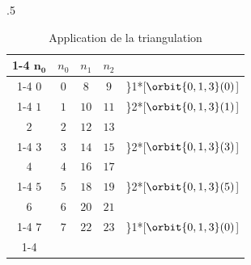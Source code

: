 \begin{table}[htb!]
	\caption{Tableaux de filtrage des faces scindées}
	\label{tab:reevaluation-scripts-alternative-appariement-filtrage-faces}
	\begin{subtable}{.5\linewidth}
		\caption{Application de la triangulation}
		\label{tab:reevaluation-scripts-alternative-appariement-filtrage-faces-triangulation}
		\begin{tabular}{|c||c|c|c|l@{\,}}
			\cline{1-4}%
			\(\mathbf{n_{0}}\) & \(n_{0}\)                    & \(n_{1}\)                     & \(n_{2}\)                     &                                                   \\
			\cline{1-4}%
			\addlinespace[2pt]%
			\cline{1-4}%
			\(0\)              & \textcolor{myblueink}{\(0\)} & \textcolor{myblueink}{\(8\)}  & \textcolor{myblueink}{\(9\)}  & \rdelim\}{1}{*}[\hspace{2pt}\(\orbit{0,1,3}(0)\)] \\
			\cline{1-4}%
			\(1\)              & \textcolor{myblueink}{\(1\)} & \textcolor{myblueink}{\(10\)} & \textcolor{myblueink}{\(11\)} & \rdelim\}{2}{*}[\(\orbit{0,1,3}(1)\)]             \\
			\(2\)              & \textcolor{myblueink}{\(2\)} & \textcolor{myblueink}{\(12\)} & \textcolor{myblueink}{\(13\)} &                                                   \\
			\cline{1-4}%
			\(3\)              & \textcolor{myblueink}{\(3\)} & \textcolor{myblueink}{\(14\)} & \textcolor{myblueink}{\(15\)} & \rdelim\}{2}{*}[\(\orbit{0,1,3}(3)\)]             \\
			\(4\)              & \textcolor{myblueink}{\(4\)} & \textcolor{myblueink}{\(16\)} & \textcolor{myblueink}{\(17\)} &                                                   \\
			\cline{1-4}%
			\(5\)              & \textcolor{myblueink}{\(5\)} & \textcolor{myblueink}{\(18\)} & \textcolor{myblueink}{\(19\)} & \rdelim\}{2}{*}[\(\orbit{0,1,3}(5)\)]             \\
			\(6\)              & \textcolor{myblueink}{\(6\)} & \textcolor{myblueink}{\(20\)} & \textcolor{myblueink}{\(21\)} &                                                   \\
			\cline{1-4}%
			\(7\)              & \textcolor{myblueink}{\(7\)} & \textcolor{myblueink}{\(22\)} & \textcolor{myblueink}{\(23\)} & \rdelim\}{1}{*}[\hspace{2pt}\(\orbit{0,1,3}(0)\)] \\
			\cline{1-4}%

\end{tabular}
\end{subtable}
\end{table}
